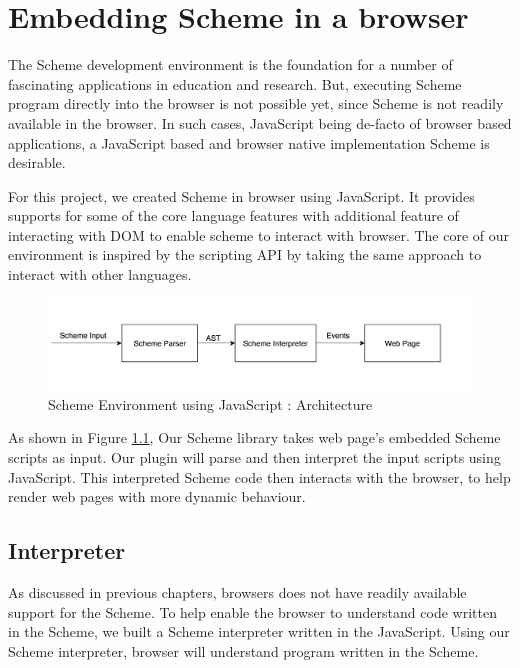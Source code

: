 \chapter{Embedding Scheme in a browser} \label{scheme}

The Scheme development environment is the foundation for a number of fascinating applications in education and research. But, executing Scheme program directly into the browser is not possible yet, since Scheme is not readily available in the browser. In such cases, JavaScript being de-facto of browser based applications, a JavaScript based and browser native implementation Scheme is desirable.

For this project, we created Scheme in browser using JavaScript. It provides supports for some of the core language features with additional feature of interacting with DOM to enable scheme to interact with browser.  The core of our environment is inspired by the scripting API \cite{javascripting} by taking the same approach to interact with other languages. 

\begin{figure}[ht]
	\begin{center}
		\includegraphics[width=\linewidth]{./images/SchemeEnvironmentusingJavaScript.png}
	\end{center}
	\caption{Scheme Environment using JavaScript : Architecture}
	\label{fig:SchemeEnvironmentusingJavaScript}
\end{figure}


As shown in Figure \ref{fig:SchemeEnvironmentusingJavaScript}, Our Scheme library takes web page's embedded Scheme scripts as input. Our plugin will parse and then interpret the input scripts using JavaScript. This interpreted Scheme code then interacts with the browser, to help render web pages with more dynamic behaviour. 

\section{Interpreter} 
As discussed in previous chapters, browsers does not have readily available support for the Scheme. To help enable the browser to understand code written in the Scheme, we built a Scheme interpreter written in the JavaScript. Using our Scheme interpreter, browser will understand program written in the Scheme.

